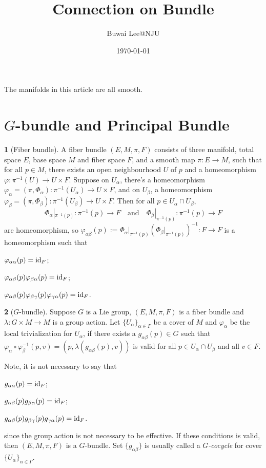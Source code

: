 \documentclass[11pt]{article}
\theoremstyle{definition}
\newtheorem{para}{}[part]
\theoremstyle{plain}
\begin{document}
\title{Connection on Bundle}
\author{Buwai Lee@NJU}
\date{\today}
\maketitle

The manifolds in this article are all smooth.

\section{$G$-bundle and Principal Bundle}

\begin{para}[Fiber bundle]
A fiber bundle $(E,M,\pi,F)$ consists of three manifold, total space $E$, base space $M$ and fiber space $F$, and a smooth map $\pi:E\to M$, such that for all $p\in M$, there exists an open neighbourhood $U$ of $p$ and a homeomorphism $\varphi:\pi^{-1}(U)\to U\times F$. 
Suppose on $U_{\alpha}$, there's a homeomorphism $\varphi_\alpha=(\pi,\Phi_\alpha):\pi^{-1}(U_\alpha)\to U\times F$, and on $U_\beta$, a homeomorphism $\varphi_\beta=(\pi,\Phi_\beta):\pi^{-1}(U_\beta)\to U\times F$. Then for all $p\in U_\alpha\cap U_\beta$,
\[
	\Phi_{\alpha}|_{\pi^{-1}(p)}:\pi^{-1}(p)\to F\quad \text{and}\quad \Phi_{\beta}|_{\pi^{-1}(p)}:\pi^{-1}(p)\to F
\]
are homeomorphism, so $\varphi_{\alpha\beta}(p):=\Phi_{\alpha}|_{\pi^{-1}(p)}(\Phi_{\beta}|_{\pi^{-1}(p)})^{-1}:F\to F$ is a homeomorphism such that
\begin{compactenum}
	\item $\varphi_{\alpha\alpha}(p)=\operatorname{id}_F$;
	\item $\varphi_{\alpha\beta}(p)\varphi_{\beta\alpha}(p)=\operatorname{id}_F$;
	\item $\varphi_{\alpha\beta}(p)\varphi_{\beta\gamma}(p)\varphi_{\gamma\alpha}(p)=\operatorname{id}_F$.
\end{compactenum}
\end{para}

\begin{para}[$G$-bundle]
Suppose $G$ is a Lie group, $(E,M,\pi,F)$ is a fiber bundle and $\lambda:G\times M\to M$ is a group action. Let $\{U_\alpha\}_{\alpha\in \Gamma}$ be a cover of $M$ and $\varphi_\alpha$ be the local trivialization for $U_\alpha$, if there exists a $g_{\alpha\beta}(p)\in G$ such that $\varphi_{\alpha}\circ \varphi_{\beta}^{-1}(p,v)=(p,\lambda(g_{\alpha\beta}(p),v))$ is valid for all $p\in U_\alpha\cap U_\beta$ and all $v\in F$. 

Note, it is not necessary to say that 
\begin{compactenum}
	\item $g_{\alpha\alpha}(p)=\operatorname{id}_F$;
	\item $g_{\alpha\beta}(p)g_{\beta\alpha}(p)=\operatorname{id}_F$;
	\item $g_{\alpha\beta}(p)g_{\beta\gamma}(p)g_{\gamma\alpha}(p)=\operatorname{id}_F$.
\end{compactenum}
since the group action is not necessary to be {effective}. If these conditions is valid, then $(E,M,\pi,F)$ is a $G$-bundle. Set $\{g_{\alpha\beta}\}$ is usually called a \textit{$G$-cocycle} for cover $\{U_\alpha\}_{\alpha\in \Gamma}$.
\end{para}
\end{document}
